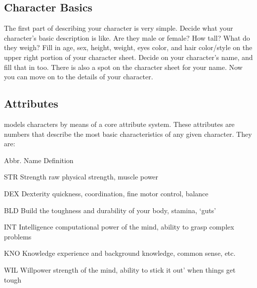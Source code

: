 \documentclass[twoside]{book}
\begin{document}
\subsection{Character Basics}
     The first part of describing your character is very
               simple. Decide what your character's basic
               description is like. Are they male or female? How tall?
               What do they weigh? Fill in age, sex, height, weight, eyes
               color, and hair color/style on the upper right portion of
               your character sheet. Decide on your character's
               name, and fill that in too. There is also a spot on the
               character sheet for your name. Now you can move on to the
               details of your character. 
\subsection{Attributes}
    \APATHY{}  models characters by means of a core
              attribute system. These attributes are numbers that
              describe the most basic characteristics of any given
              character. They are:
              
                
                  
                   Abbr.   
                   Name   
                   Definition   
                  
                  
                   STR   
                   Strength   
                   raw physical strength, muscle power   
                  
                  
                   DEX   
                   Dexterity   
                     quickness, coordination, fine motor control,
                     balance 
                  
                  
                   BLD   
                   Build   
                     the toughness and durability of your body,
                     stamina, `guts' 
                  
                  
                   INT   
                   Intelligence   
                     computational power of the mind, ability to
                     grasp complex problems 
                  
                  
                   KNO   
                   Knowledge   
                     experience and background knowledge, common
                     sense, etc. 
                  
                  
                   WIL   
                   Willpower   
                     strength of the mind, ability to stick
                     it out' when things get tough 
                  
\end{document}
